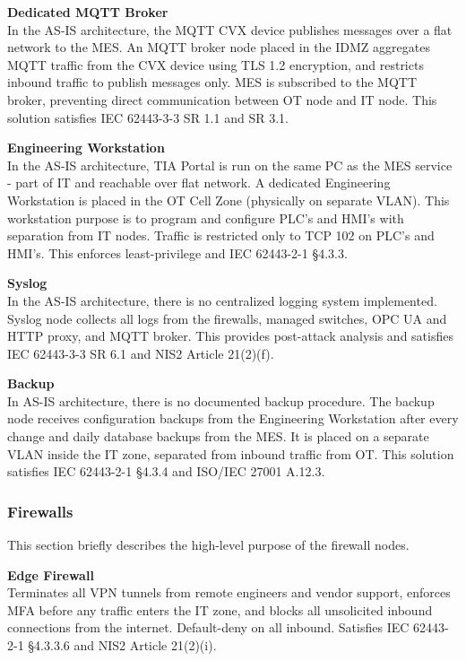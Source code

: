 \documentclass[11pt,a4paper]{article}
\begin{document}
\textbf{Dedicated MQTT Broker} \\ In the AS-IS architecture, the MQTT CVX device
publishes messages over a flat network to the MES. An MQTT broker node placed in
the IDMZ aggregates MQTT traffic from the CVX device using TLS 1.2 encryption, and
restricts inbound traffic to publish messages only. MES is subscribed to the
MQTT broker, preventing direct communication between OT node and IT node. This
solution satisfies IEC 62443-3-3 SR 1.1 and SR 3.1.

\textbf{Engineering Workstation} \\ In the AS-IS architecture, TIA Portal is
run on the same PC as the MES service - part of IT and reachable over flat network.
A dedicated Engineering Workstation is placed in the OT Cell Zone (physically
on separate VLAN). This workstation purpose is to program and configure PLC's
and HMI's with separation from IT nodes. Traffic is restricted only to TCP 102
on PLC's and HMI's. This enforces least-privilege and IEC 62443-2-1 §4.3.3.

\pagebreak
\textbf{Syslog} \\ In the AS-IS architecture, there is no centralized logging
system implemented. Syslog node collects all logs from the firewalls, managed
switches, OPC UA and HTTP proxy, and MQTT broker. This provides post-attack
analysis and satisfies IEC 62443-3-3 SR 6.1 and NIS2 Article 21(2)(f).

\textbf{Backup} \\ In AS-IS architecture, there is no documented backup
procedure. The backup node receives configuration backups from the Engineering
Workstation after every change and daily database backups from the MES. It is
placed on a separate VLAN inside the IT zone, separated from inbound traffic from
OT. This solution satisfies IEC 62443-2-1 §4.3.4 and ISO/IEC 27001 A.12.3.

\subsubsection{Firewalls} 
This section briefly describes the high-level purpose of the firewall
nodes.

\textbf{Edge Firewall} \\ Terminates all VPN tunnels from remote engineers and
vendor support, enforces MFA before any traffic enters the IT zone, and blocks
all unsolicited inbound connections from the internet. Default-deny on all
inbound. Satisfies IEC 62443-2-1 §4.3.3.6 and NIS2 Article 21(2)(i).
\end{document}

